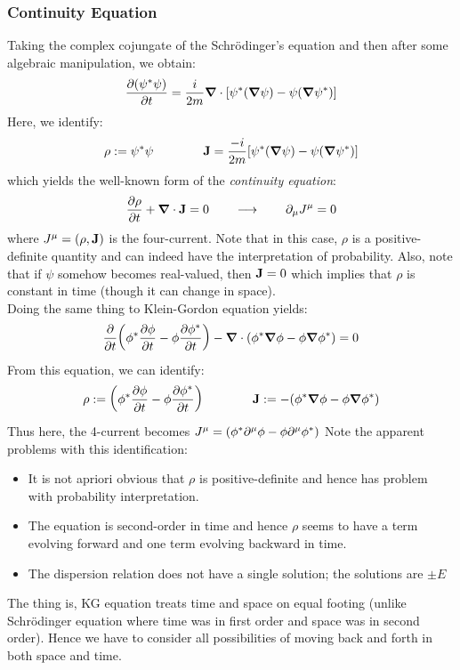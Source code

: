 \subsubsection{Continuity Equation}
Taking the complex cojungate of the Schr\"odinger's equation and then after some algebraic manipulation, we obtain:
\begin{align*}
     \pdv{(\psi^*\psi)}{t} = \frac{i}{2m} \grad \cdot \qty[\psi^*(\grad\psi) - \psi (\grad \psi^*)]
\end{align*}
Here, we identify:
$$\rho := \psi^*\psi\qquad\qquad \vb{J} = \frac{-i}{2m}\qty[\psi^*(\grad\psi) - \psi (\grad \psi^*)]$$ which yields the well-known form of the \textit{continuity equation}:
$$\pdv{\rho}{t} + \grad\cdot\vb{J} = 0\qquad \longrightarrow \qquad\partial_\mu J^\mu = 0$$
where $J^\mu = (\rho, \vb{J})$ is the four-current.
Note that in this case, $\rho$ is a positive-definite quantity and can indeed have the interpretation of probability. Also, note that if $\psi$ somehow becomes real-valued, then $\vb{J}=0$ which implies that $\rho$ is constant in time (though it can change in space). \\[0.2cm]
Doing the same thing to Klein-Gordon equation yields:
$$\pdv{t}\qty(\phi^*\pdv{\phi}{t}-\phi\pdv{\phi^*}{t})-\grad\cdot\qty(\phi^*\grad{\phi}-\phi\grad{\phi^*})=0$$
From this equation, we can identify:
$$\rho :=  \qty(\phi^*\pdv{\phi}{t}-\phi\pdv{\phi^*}{t}) \qquad\qquad \vb{J} := - \qty(\phi^*\grad{\phi}-\phi\grad{\phi^*})$$
Thus here, the 4-current becomes $J^\mu = \qty(\phi^* \partial^\mu \phi - \phi \partial^\mu \phi^*)$
Note the apparent problems with this identification:
\begin{itemize}
    \item It is not apriori obvious that $\rho$ is positive-definite and hence has problem with probability interpretation.
    \item The equation is second-order in time and hence $\rho$ seems to have a term evolving forward and one term evolving backward in time. 
    \item The dispersion relation does not have a single solution; the solutions are $\pm E$
\end{itemize}
The thing is, KG equation treats time and space on equal footing (unlike Schr\"odinger equation where time was in first order and space was in second order). Hence we have to consider all possibilities of moving back and forth in both space and time. 